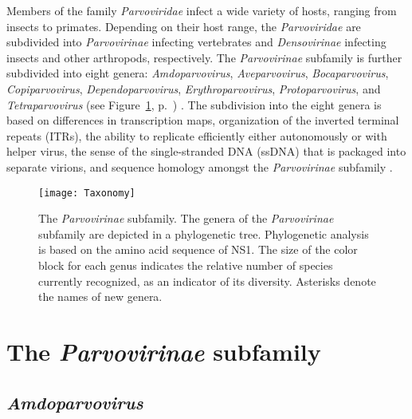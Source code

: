 Members of the family \textit{Parvoviridae} infect a wide variety of hosts, ranging from insects to primates.
Depending on their host range, the \textit{Parvoviridae} are subdivided into \textit{Parvovirinae} infecting vertebrates and \textit{Densovirinae} infecting insects and other arthropods, respectively. The \textit{Parvovirinae} subfamily is further subdivided into eight genera: \textit{Amdoparvovirus}, \textit{Aveparvovirus}, \textit{Bocaparvovirus}, \textit{Copiparvovirus}, \textit{Dependoparvovirus}, \textit{Erythroparvovirus}, \textit{Protoparvovirus}, and \textit{Tetraparvovirus} (see Figure~\ref{Fig: Taxonomy}, p.~\pageref{Fig: Taxonomy}) \cite{pmid24212889}. The subdivision into the eight genera is based on differences in transcription maps, organization of the inverted terminal repeats (ITRs), the ability to replicate efficiently either autonomously or with helper virus, the sense of the single-stranded DNA (ssDNA) that is packaged into separate virions, and sequence homology amongst the \textit{Parvovirinae} subfamily \cite{pmid11222696, icvt}.


\begin{figure}[h]
\centering
\texttt{[image: Taxonomy]}
\caption[The \textit{Parvovirinae} subfamily]{The \textit{Parvovirinae} subfamily. The genera of the \textit{Parvovirinae} subfamily are depicted in a phylogenetic tree. Phylogenetic analysis is based on the amino acid sequence of NS1. The size of the color block for each genus indicates the relative number of species currently recognized, as an indicator of its diversity. Asterisks denote the names of new genera.} 
\label{Fig: Taxonomy}
\end{figure}



\section{The \textit{Parvovirinae} subfamily}
\label{sec: The Parvovirinae subfamily}   


\subsection{\textit{Amdoparvovirus}}

